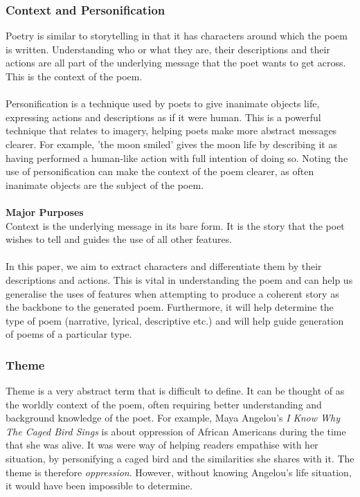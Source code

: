 \subsubsection{Context and Personification}
Poetry is similar to storytelling in that it has characters around which the poem is written. Understanding who or what they are, their descriptions and their actions are all part of the underlying message that the poet wants to get across. This is the context of the poem.
\\\\
Personification is a technique used by poets to give inanimate objects life, expressing actions and descriptions as if it were human. This is a powerful technique that relates to imagery, helping poets make more abstract messages clearer. For example, 'the moon smiled' gives the moon life by describing it as having performed a human-like action with full intention of doing so. Noting the use of personification can make the context of the poem clearer, as often inanimate objects are the subject of the poem.
\\\\
\textbf{Major Purposes}\\
Context is the underlying message in its bare form. It is the story that the poet wishes to tell and guides the use of all other features.
\\\\
In this paper, we aim to extract characters and differentiate them by their descriptions and actions. This is vital in understanding the poem and can help us generalise the uses of features when attempting to produce a coherent story as the backbone to the generated poem. Furthermore, it will help determine the type of poem (narrative, lyrical, descriptive etc.) and will help guide generation of poems of a particular type. 

\subsubsection{Theme}
Theme is a very abstract term that is difficult to define. It can be thought of as the worldly context of the poem, often requiring better understanding and background knowledge of the poet. For example, Maya Angelou's \textit{I Know Why The Caged Bird Sings} is about oppression of African Americans during the time that she was alive. It was were way of helping readers empathise with her situation, by personifying a caged bird and the similarities she shares with it. The theme is therefore \textit{oppression}. However, without knowing Angelou's life situation, it would have been impossible to determine.


